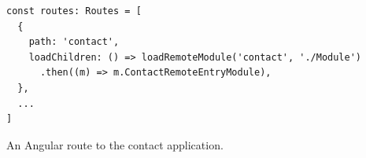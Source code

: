 \ifshowListings
\begin{listing}[H]
  \begin{verbatim}
const routes: Routes = [
  {
    path: 'contact',
    loadChildren: () => loadRemoteModule('contact', './Module')
      .then((m) => m.ContactRemoteEntryModule),
  },
  ...
]
  \end{verbatim}
  \caption{An Angular route to the contact application.}\label{code:applied-methods:angular-route-to-remote-module}
\end{listing}
\fi

\ifshowAppliedMethodsCustomNginxConfSection
  
\fi





\ifshowAppliedMethodsLoadRemoteSettingsSection
  
\fi

\ifshowAppliedMethodsSecondaryEntrypoints
  
\fi